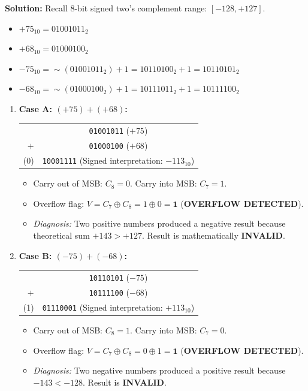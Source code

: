 \textbf{Solution:}
Recall 8-bit signed two's complement range: $[-128, +127]$.
\begin{itemize}
    \item $+75_{10} = 01001011_2$
    \item $+68_{10} = 01000100_2$
    \item $-75_{10} = \sim(01001011_2) + 1 = 10110100_2 + 1 = 10110101_2$
    \item $-68_{10} = \sim(01000100_2) + 1 = 10111011_2 + 1 = 10111100_2$
\end{itemize}

\begin{enumerate}[label=\bfseries\alph*.]
    \item \textbf{Case A: $(+75) + (+68)$:}
    \begin{center}
    \begin{tabular}{r c}
      & \texttt{01001011} \quad ($+75$) \\
    $+$ & \texttt{01000100} \quad ($+68$) \\
    \hline
    (0) & \texttt{10001111} \quad (Signed interpretation: $-113_{10}$)
    \end{tabular}
    \end{center}
    \begin{itemize}
        \item Carry out of MSB: $C_8 = 0$. Carry into MSB: $C_7 = 1$.
        \item Overflow flag: $V = C_7 \oplus C_8 = 1 \oplus 0 = \mathbf{1}$ (\textbf{OVERFLOW DETECTED}).
        \item \textit{Diagnosis:} Two positive numbers produced a negative result because theoretical sum $+143 > +127$. Result is mathematically \textbf{INVALID}.
    \end{itemize}

    \item \textbf{Case B: $(-75) + (-68)$:}
    \begin{center}
    \begin{tabular}{r c}
      & \texttt{10110101} \quad ($-75$) \\
    $+$ & \texttt{10111100} \quad ($-68$) \\
    \hline
    (1) & \texttt{01110001} \quad (Signed interpretation: $+113_{10}$)
    \end{tabular}
    \end{center}
    \begin{itemize}
        \item Carry out of MSB: $C_8 = 1$. Carry into MSB: $C_7 = 0$.
        \item Overflow flag: $V = C_7 \oplus C_8 = 0 \oplus 1 = \mathbf{1}$ (\textbf{OVERFLOW DETECTED}).
        \item \textit{Diagnosis:} Two negative numbers produced a positive result because $-143 < -128$. Result is \textbf{INVALID}.
    \end{itemize}


\end{enumerate}
